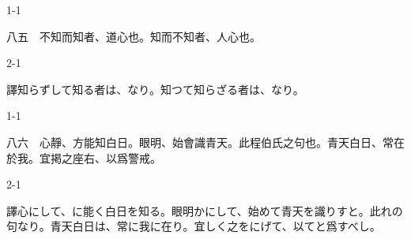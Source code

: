 \documentclass[tate,paper=b6j,jafontsize=9pt]{jlreq}
\begin{document}
\begin{azconvIndented}{1\zw}{-1\zw}

八五　不知而知者、道心也。知而不知者、人心也。

\end{azconvIndented}
\begin{azconvIndented}{2\zw}{-1\zw}

譯知らずして知る者は、なり。知つて知らざる者は、なり。

\end{azconvIndented}

\begin{azconvIndented}{1\zw}{-1\zw}

八六　心靜、方能知白日。眼明、始會識青天。此程伯氏之句也。青天白日、常在於我。宜掲之座右、以爲警戒。

\end{azconvIndented}
\begin{azconvIndented}{2\zw}{-1\zw}

譯心にして、に能く白日を知る。眼明かにして、始めて青天を識りすと。此れの句なり。青天白日は、常に我に在り。宜しく之をにげて、以てと爲すべし。

\end{azconvIndented}
\end{document}
